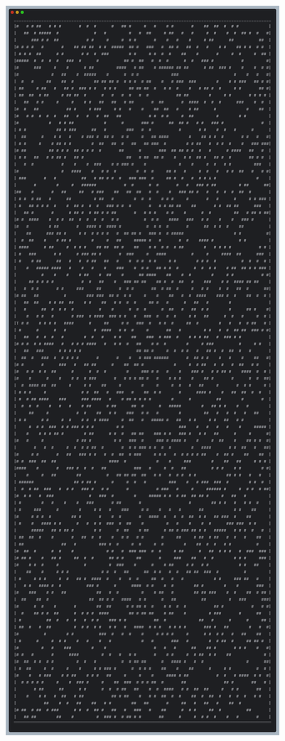 \documentclass[10pt]{article}
\begin{document}
\begin{center}
\includegraphics[width=\textwidth,height=\textheight,keepaspectratio]{screenshot.png}
\end{center}
\end{document}
